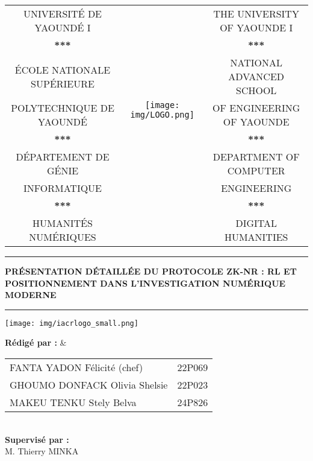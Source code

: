 \documentclass[11pt]{article}
\begin{document}
\begin{center}\hspace*{-0.5cm}
  \begin{tabular}{ccc}
 
    {\large UNIVERSIT\'E DE YAOUND\'E I} & \multirow{8}{*}{\texttt{[image: img/LOGO.png]}} & \large{ THE UNIVERSITY OF YAOUNDE I}\\
    \textbf{***} &    & \textbf{***} \\
    \textcolor{-yellow}{\'ECOLE NATIONALE SUP\'ERIEURE}& & \textcolor{-yellow}{NATIONAL ADVANCED SCHOOL}\\ 
    \textcolor{-yellow}{POLYTECHNIQUE DE YAOUND\'E}   & & \textcolor{-yellow}{OF ENGINEERING OF YAOUNDE} \\
    \textbf{***}    & & \textbf{***} \\
    D\'EPARTEMENT DE G\'ENIE& & DEPARTMENT OF COMPUTER \\ 
    INFORMATIQUE & & ENGINEERING \\
    \textbf{***} &    & \textbf{***} \\
    \textcolor{-yellow}{HUMANITÉS NUMÉRIQUES} & & \textcolor{-yellow}{DIGITAL HUMANITIES}
    \end{tabular}
 
\end{center}
\vspace{2cm}

\pagestyle{fancy}
\begin{center}
\hrule height 2pt
\vspace{0.4cm}
{\LARGE \textbf{PRÉSENTATION DÉTAILLÉE DU PROTOCOLE ZK-NR : RL ET POSITIONNEMENT DANS L’INVESTIGATION NUMÉRIQUE MODERNE}
\vspace{0.5cm}
\hrule height 2pt
\vspace{0.4cm}
\texttt{[image: img/iacrlogo\_small.png]}}
\end{center}

\vspace{0.90cm}
\begin{center}
\textbf{Rédigé par :} & \\[0.3cm]
\begin{tabular}{l@{\hspace{1cm}}l}
FANTA YADON Félicité (chef) & 22P069 \\[0.3cm]
GHOUMO DONFACK Olivia Shelsie & 22P023 \\[0.3cm]
MAKEU TENKU Stely Belva & 24P826 \\
\end{tabular}\\
\vspace{1cm}
\textbf{Supervisé par :}\\[0.3cm]
M. Thierry MINKA
\end{center}
\end{document}
